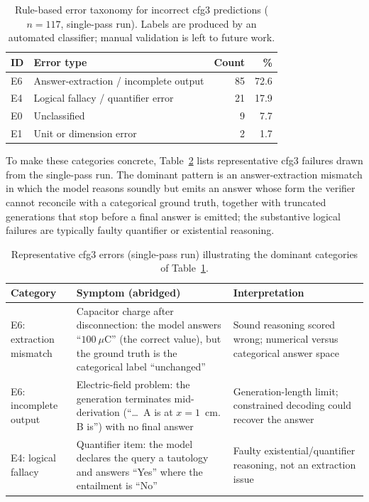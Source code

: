 \documentclass[APA,twocolumn]{USG}
\begin{document}
\begin{table}[t]
\centering
\caption{Rule-based error taxonomy for incorrect cfg3 predictions ($n=117$,
single-pass run). Labels are produced by an automated classifier; manual
validation is left to future work.\label{tab10}}
\begin{tabular*}{\columnwidth}{@{\extracolsep\fill}llrr@{\extracolsep\fill}}
\toprule
\textbf{ID} & \textbf{Error type} & \textbf{Count} & \textbf{\%} \\
\midrule
E6 & Answer-extraction / incomplete output & 85 & 72.6 \\
E4 & Logical fallacy / quantifier error & 21 & 17.9 \\
E0 & Unclassified & \hphantom{0}9 & \hphantom{0}7.7 \\
E1 & Unit or dimension error & \hphantom{0}2 & \hphantom{0}1.7 \\
\bottomrule
\end{tabular*}
\end{table}

To make these categories concrete, Table~\ref{tab11} lists representative cfg3
failures drawn from the single-pass run. The dominant pattern is an
answer-extraction mismatch in which the model reasons soundly but emits an answer
whose form the verifier cannot reconcile with a categorical ground truth,
together with truncated generations that stop before a final answer is emitted;
the substantive logical failures are typically faulty quantifier or existential
reasoning.

\begin{table}[t]
\centering
\caption{Representative cfg3 errors (single-pass run) illustrating the dominant
categories of Table~\ref{tab10}.\label{tab11}}
\begin{tabular*}{\textwidth}{@{\extracolsep\fill}p{}p{}p{}@{}}
\toprule
\textbf{Category} & \textbf{Symptom (abridged)} & \textbf{Interpretation} \\
\midrule
E6: extraction mismatch & Capacitor charge after disconnection: the model answers ``$100~\mu$C'' (the correct value), but the ground truth is the categorical label ``unchanged'' & Sound reasoning scored wrong; numerical versus categorical answer space \\
E6: incomplete output & Electric-field problem: the generation terminates mid-derivation (``\ldots\ A is at $x=1$~cm. B is'') with no final answer & Generation-length limit; constrained decoding could recover the answer \\
E4: logical fallacy & Quantifier item: the model declares the query a tautology and answers ``Yes'' where the entailment is ``No'' & Faulty existential/quantifier reasoning, not an extraction issue \\
\bottomrule
\end{tabular*}
\end{table}
\end{document}
